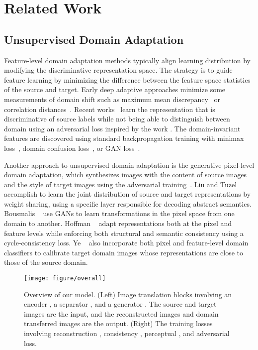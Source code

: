 \documentclass[final]{cvpr}
\begin{document}
     



\section{Related Work}
\label{sec:related}

\subsection{Unsupervised Domain Adaptation}
Feature-level domain adaptation methods typically align learning distribution by modifying the discriminative representation space.
The strategy is to guide feature learning by minimizing the difference between the feature space statistics of the source and target.
Early deep adaptive approaches minimize some measurements of domain shift such as maximum mean discrepancy~\cite{tzeng2014deep,long2015learning} or correlation distances~\cite{sun2016deep}. 
Recent works~\cite{ganin2016domain,tzeng2015simultaneous,tzeng2017adversarial} learn the representation that is discriminative of source labels while not being able to distinguish between domain using an adversarial loss inspired by the work \cite{ben2006analysis}.
The domain-invariant features are discovered using standard backpropagation training with minimax loss~\cite{ganin2016domain}, domain confusion loss~\cite{tzeng2015simultaneous}, or GAN loss~\cite{tzeng2017adversarial}.

Another approach to unsupervised domain adaptation is the generative pixel-level domain adaptation, which synthesizes images with the content of source images and the style of target images using the adversarial training~\cite{goodfellow2014generative}.
Liu and Tuzel~\cite{liu2016coupled} accomplish to learn the joint distribution of source and target representations by weight sharing, using a specific layer responsible for decoding abstract semantics.
Bousmalis \etal~\cite{bousmalis2017unsupervised} use GANs to learn transformations in the pixel space from one domain to another. 
Hoffman \etal~\cite{hoffman2018cycada} adapt representations both at the pixel and feature levels while enforcing both structural and semantic consistency using a cycle-consistency loss.
Ye \etal~\cite{ye2020light} also incorporate both pixel and feature-level domain classifiers to calibrate target domain images whose representations are close to those of the source domain.


\begin{figure*}[t] 
	\centering
    \texttt{[image: figure/overall]}
	\caption{Overview of our model. (Left) Image translation blocks involving an encoder , a separator , and a generator . The source and target images  are the input, and the reconstructed images  and domain transferred images  are the output. (Right) The training losses involving reconstruction , consistency , perceptual , and adversarial  loss.}
	\label{fig:overview}
	\vspace{-3mm}
\end{figure*}
\end{document}
